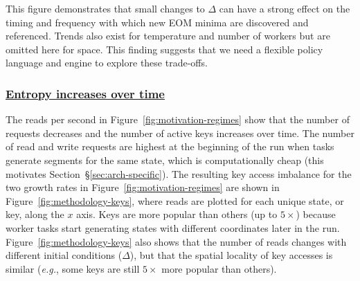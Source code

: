 This figure demonstrates that small changes to \(\Delta\) can have a strong
effect on the timing and frequency with which new EOM minima are discovered and
referenced.  Trends also exist for temperature and number of workers but are
omitted here for space.  This finding suggests that we need a flexible policy
language and engine to explore these trade-offs.  

\subsubsection{\underline{Entropy increases over time}} The reads per second in
Figure~\ref{fig:motivation-regimes} show that the number of requests decreases
and the number of active keys increases over time.  The number of read and
write requests are highest at the beginning of the run when tasks generate
segments for the same state, which is computationally cheap (this motivates
Section~\S\ref{sec:arch-specific}).  The resulting key access imbalance for the
two growth rates in Figure~\ref{fig:motivation-regimes} are shown in
Figure~\ref{fig:methodology-keys}, where reads are plotted for each unique
state, or key, along the \(x\) axis. Keys are more popular than others (up to
\(5\times\)) because worker tasks start generating states with different
coordinates later in the run.  Figure~\ref{fig:methodology-keys} also shows that the
number of reads changes with different initial conditions (\(\Delta\)), but
that the spatial locality of key accesses is similar ({\it e.g.}, some keys are
still \(5\times\) more popular than others).
